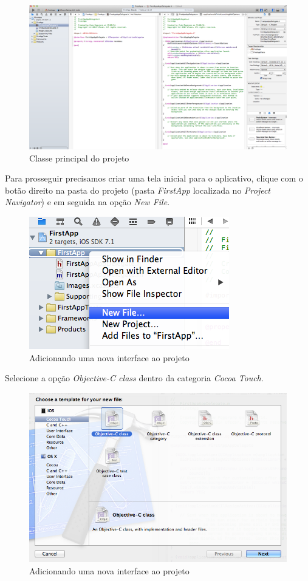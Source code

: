 \documentclass[a4paper,12pt,brazil,doubleside]{book}
\begin{document}
\begin{singlespace}
\begin{figure}[H]
  \centering
  \includegraphics[width=.99\textwidth]{figuras/3/tela_novo_projeto_5.png}
  \caption{Classe principal do projeto}
  \label{fig:a}
\end{figure}


Para prosseguir precisamos criar uma tela inicial para o aplicativo, clique com o botão direito na pasta do projeto (pasta \emph{FirstApp} localizada no \emph{Project Navigator}) e em seguida na opção \emph{New File}.

\begin{figure}[H]
  \centering
  \includegraphics[width=.35\textwidth]{figuras/3/tela_novo_projeto_6.png}
  \caption{Adicionando uma nova interface ao projeto}
  \label{fig:a}
\end{figure}


Selecione a opção \emph{Objective-C class} dentro da categoria \emph{Cocoa Touch}.

\begin{figure}[H]
  \centering
  \includegraphics[width=.75\textwidth]{figuras/3/tela_novo_projeto_7.png}
  \caption{Adicionando uma nova interface ao projeto}
  \label{fig:a}
\end{figure}



\end{singlespace}
\end{document}
